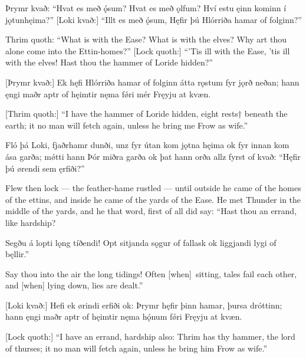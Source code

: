 Þrymr kvað:
“Hvat es með ǫ́sum? \hld Hvat es með ǫlfum?
Hví estu ęinn kominn \hld í jǫtunhęima?”
[Loki kvað:]
“Illt es með ǫ́sum, \footnotemark[1]
Hęfir þú Hlórriða \hld hamar of folginn?”

Thrim quoth:
“What is with the Ease? What is with the elves? Why art thou alone come into the Ettin-homes?”
[Lock quoth:]
“’Tis ill with the Ease, ’tis ill with the elves! Hast thou the hammer of Loride hidden?”

[Þrymr kvað:]
Ek hęfi Hlórriða \hld hamar of folginn
átta rǫstum \hld fyr jǫrð neðan;
hann ęngi maðr \hld aptr of hęimtir
nęma fǿri mér \hld Fręyju at kvæn.

[Thrim quoth:]
“I have the hammer of Loride hidden, eight rests† beneath the earth; it no man will fetch again, unless he bring me Frow as wife.”

Fló þá Loki, \hld fjaðrhamr dunði,
unz fyr útan kom \hld jǫtna hęima
ok fyr innan kom \hld ása garða;
mǿtti hann Þór \hld miðra garða
ok þat hann orða \hld allz fyrst of kvað:
“Hęfir þú ørendi \hld sem ęrfiði?”

Flew then lock — the feather-hame rustled — until outside he came of the homes of the ettins, and inside he came of the yards of the Ease. He met Thunder in the middle of the yards, and he that word, first of all did say: “Hast thou an errand, like hardship?\footnotemark[1]

Segðu á lopti \hld lǫng tíðendi!
Opt sitjanda \hld sǫgur of fallask
ok liggjandi \hld lygi of bęllir.”

Say thou into the air the long tidings! Often [when] sitting, tales fail each other, and [when] lying down, lies are dealt.”\footnotemark[1]

[Loki kvað:]
Hefi ek ørindi \hld erfiði ok:
Þrymr hęfir þinn hamar, \hld þursa dróttinn;
hann ęngi maðr \hld aptr of hęimtir
nęma hǫ́num fǿri \hld Fręyju at kvæn.

[Lock quoth:]
“I have an errand, hardship also: Thrim has thy hammer, the lord of thurses; it no man will fetch again, unless he bring him Frow as wife.”

